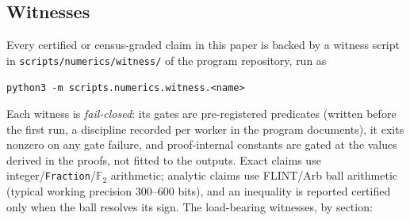\documentclass[11pt,reqno]{amsart}
\theoremstyle{plain}
\theoremstyle{definition}
\theoremstyle{remark}
\newcommand{\F}{\mathbb{F}}
\begin{document}
\subsection*{Witnesses}
Every certified or census-graded claim in this paper is backed by a witness script in
\texttt{scripts/numerics/witness/} of the program repository, run as
\begin{center}
\texttt{python3 -m scripts.numerics.witness.<name>}
\end{center}
Each witness is \emph{fail-closed}: its gates are pre-registered predicates (written before
the first run, a discipline recorded per worker in the program documents), it exits nonzero
on any gate failure, and proof-internal constants are gated at the values derived in the
proofs, not fitted to the outputs. Exact claims use integer/\texttt{Fraction}/$\F_2$
arithmetic; analytic claims use FLINT/Arb ball arithmetic (typical working precision
300--600 bits), and an inequality is reported certified only when the ball resolves its
sign. The load-bearing witnesses, by section:
\end{document}
